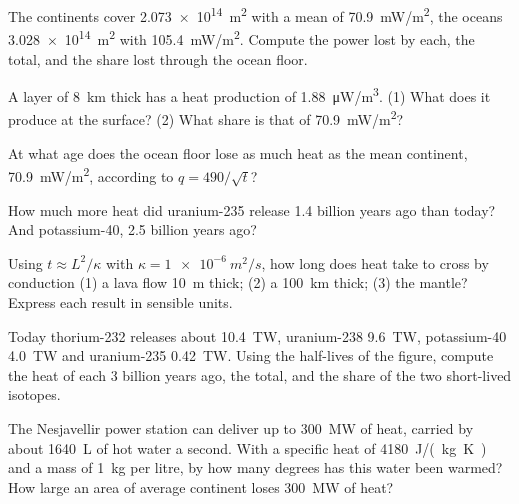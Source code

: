 \begin{exercise}[$\star\star$]\label{exo:g12:internal-heat:7}
The continents cover \qty{2.073e14}{m^2} with a mean  of
\qty{70.9}{mW/m^2}, the oceans \qty{3.028e14}{m^2} with
\qty{105.4}{mW/m^2}. Compute the power lost by each, the total, and the share
lost through the ocean floor.
\end{exercise}

\begin{exercise}[$\star\star$]\label{exo:g12:internal-heat:8}
A layer of  \qty{8}{km} thick has a heat production of
\qty{1.88}{\micro W/m^3}. (1) What  does it produce at the surface?
(2) What share is that of \qty{70.9}{mW/m^2}?
\end{exercise}

\begin{exercise}[$\star\star$]\label{exo:g12:internal-heat:9}
At what age does the ocean floor lose as much heat as the mean continent,
\qty{70.9}{mW/m^2}, according to $q = 490/\sqrt{t}$?
\end{exercise}

\begin{exercise}[$\star\star$]\label{exo:g12:internal-heat:10}
How much more heat did uranium-235 release 1.4 billion years ago than
today? And potassium-40, 2.5 billion years ago?
\end{exercise}

\begin{exercise}[$\star\star$]\label{exo:g12:internal-heat:11}
Using $t \approx L^2/\kappa$ with $\kappa = \qty{1e-6}{m^2/s}$, how long
does heat take to cross by conduction (1) a lava flow \qty{10}{m} thick;
(2) a  \qty{100}{km} thick; (3) the mantle? Express each result
in sensible units.
\end{exercise}

\begin{exercise}[$\star\star\star$]\label{exo:g12:internal-heat:12}
Today thorium-232 releases about \qty{10.4}{TW}, uranium-238 \qty{9.6}{TW},
potassium-40 \qty{4.0}{TW} and uranium-235 \qty{0.42}{TW}. Using the
half-lives of the figure, compute the heat of
each 3 billion years ago, the total, and the share of the two short-lived
isotopes.
\end{exercise}

\begin{exercise}[$\star\star\star$]\label{exo:g12:internal-heat:13}
The Nesjavellir power station can deliver up to \qty{300}{MW} of heat,
carried by about \qty{1640}{L} of hot water a second. With a specific heat
of \qty{4180}{J/(kg.K)} and a mass of \qty{1}{kg} per litre, by how many
degrees has this water been warmed? How large an area of average continent
loses \qty{300}{MW} of heat?
\end{exercise}

